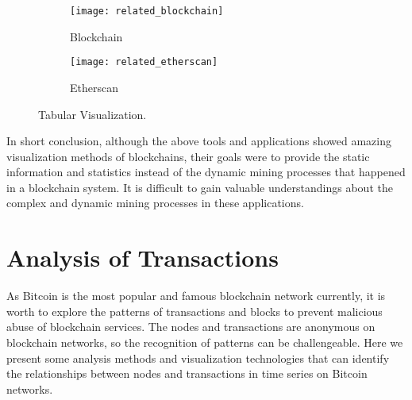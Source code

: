 \begin{figure}[htb]
    \centering
    \begin{subfigure}[b]{1\textwidth}
        \centering
        \texttt{[image: related\_blockchain]}
        \caption{Blockchain}
    \end{subfigure}

    \begin{subfigure}[b]{1\textwidth}
        \centering
        \texttt{[image: related\_etherscan]}
        \caption{Etherscan}
    \end{subfigure}

    \caption{Tabular Visualization.}
    \label{fig:tabular visualization}
\end{figure}

In short conclusion, although the above tools and applications showed amazing visualization methods of blockchains, their goals were to provide the static information and statistics instead of the dynamic mining processes that happened in a blockchain system. It is difficult to gain valuable understandings about the complex and dynamic mining processes in these applications.

\section{Analysis of Transactions}

As Bitcoin is the most popular and famous blockchain network currently, it is worth to explore the patterns of transactions and blocks to prevent malicious abuse of blockchain services. The nodes and transactions are anonymous on blockchain networks, so the recognition of patterns can be challengeable. Here we present some analysis methods and visualization technologies that can identify the relationships between nodes and transactions in time series on Bitcoin networks.

